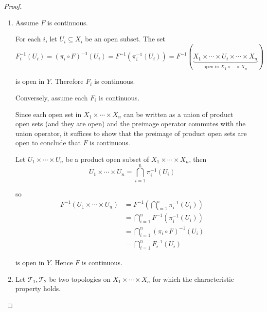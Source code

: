 \begin{proof}
    \begin{enumerate}[itemsep=0pt,label={(\alph*)}]
        \item Assume \( F \) is continuous.

              For each \( i \), let \( U_{i} \subseteq X_{i} \) be an open subset. The set
              \[
                  F_{i}^{-1}(U_{i}) = {(\pi_{i} \circ F)}^{-1}(U_{i}) = F^{-1}(\pi_{i}^{-1}(U_{i})) = F^{-1}(\underbrace{X_{1} \times \cdots \times U_{i} \times \cdots \times X_{n}}_{\text{open in } X_{1} \times \cdots \times X_{n}})
              \]

              is open in \( Y \). Therefore \( F_{i} \) is continuous.

              Conversely, assume each \( F_{i} \) is continuous.

              Since each open set in \( X_{1} \times \cdots \times X_{n} \) can be written as a union of product open sets (and they are open) and the preimage operator commutes with the union operator, it suffices to show that the preimage of product open sets are open to conclude that \( F \) is continuous.

              Let \( U_{1} \times \cdots \times U_{n} \) be a product open subset of \( X_{1} \times \cdots \times X_{n} \), then
              \[
                  U_{1} \times \cdots \times U_{n} = \bigcap_{i=1}^{n} \pi_{i}^{-1}(U_{i})
              \]

              so
              \begingroup
              \allowdisplaybreaks%
              \begin{align*}
                  F^{-1}(U_{1} \times \cdots \times U_{n}) & = F^{-1}\left( \bigcap_{i=1}^{n} \pi_{i}^{-1}(U_{i}) \right) \\
                                                           & = \bigcap_{i=1}^{n} F^{-1}(\pi_{i}^{-1}(U_{i}))              \\
                                                           & = \bigcap_{i=1}^{n} {(\pi_{i} \circ F)}^{-1}(U_{i})          \\
                                                           & = \bigcap_{i=1}^{n} F_{i}^{-1}(U_{i})
              \end{align*}
              \endgroup

              is open in \( Y \). Hence \( F \) is continuous.
        \item Let \( \mathscr{T}_{1}, \mathscr{T}_{2} \) be two topologies on \( X_{1} \times \cdots \times X_{n} \) for which the characteristic property holds.


\end{enumerate}
\end{proof}
